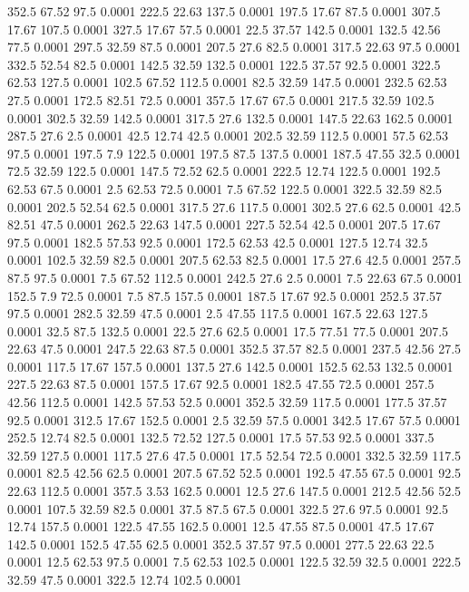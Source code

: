 352.5	67.52	97.5	0.0001
222.5	22.63	137.5	0.0001
197.5	17.67	87.5	0.0001
307.5	17.67	107.5	0.0001
327.5	17.67	57.5	0.0001
22.5	37.57	142.5	0.0001
132.5	42.56	77.5	0.0001
297.5	32.59	87.5	0.0001
207.5	27.6	82.5	0.0001
317.5	22.63	97.5	0.0001
332.5	52.54	82.5	0.0001
142.5	32.59	132.5	0.0001
122.5	37.57	92.5	0.0001
322.5	62.53	127.5	0.0001
102.5	67.52	112.5	0.0001
82.5	32.59	147.5	0.0001
232.5	62.53	27.5	0.0001
172.5	82.51	72.5	0.0001
357.5	17.67	67.5	0.0001
217.5	32.59	102.5	0.0001
302.5	32.59	142.5	0.0001
317.5	27.6	132.5	0.0001
147.5	22.63	162.5	0.0001
287.5	27.6	2.5	0.0001
42.5	12.74	42.5	0.0001
202.5	32.59	112.5	0.0001
57.5	62.53	97.5	0.0001
197.5	7.9	122.5	0.0001
197.5	87.5	137.5	0.0001
187.5	47.55	32.5	0.0001
72.5	32.59	122.5	0.0001
147.5	72.52	62.5	0.0001
222.5	12.74	122.5	0.0001
192.5	62.53	67.5	0.0001
2.5	62.53	72.5	0.0001
7.5	67.52	122.5	0.0001
322.5	32.59	82.5	0.0001
202.5	52.54	62.5	0.0001
317.5	27.6	117.5	0.0001
302.5	27.6	62.5	0.0001
42.5	82.51	47.5	0.0001
262.5	22.63	147.5	0.0001
227.5	52.54	42.5	0.0001
207.5	17.67	97.5	0.0001
182.5	57.53	92.5	0.0001
172.5	62.53	42.5	0.0001
127.5	12.74	32.5	0.0001
102.5	32.59	82.5	0.0001
207.5	62.53	82.5	0.0001
17.5	27.6	42.5	0.0001
257.5	87.5	97.5	0.0001
7.5	67.52	112.5	0.0001
242.5	27.6	2.5	0.0001
7.5	22.63	67.5	0.0001
152.5	7.9	72.5	0.0001
7.5	87.5	157.5	0.0001
187.5	17.67	92.5	0.0001
252.5	37.57	97.5	0.0001
282.5	32.59	47.5	0.0001
2.5	47.55	117.5	0.0001
167.5	22.63	127.5	0.0001
32.5	87.5	132.5	0.0001
22.5	27.6	62.5	0.0001
17.5	77.51	77.5	0.0001
207.5	22.63	47.5	0.0001
247.5	22.63	87.5	0.0001
352.5	37.57	82.5	0.0001
237.5	42.56	27.5	0.0001
117.5	17.67	157.5	0.0001
137.5	27.6	142.5	0.0001
152.5	62.53	132.5	0.0001
227.5	22.63	87.5	0.0001
157.5	17.67	92.5	0.0001
182.5	47.55	72.5	0.0001
257.5	42.56	112.5	0.0001
142.5	57.53	52.5	0.0001
352.5	32.59	117.5	0.0001
177.5	37.57	92.5	0.0001
312.5	17.67	152.5	0.0001
2.5	32.59	57.5	0.0001
342.5	17.67	57.5	0.0001
252.5	12.74	82.5	0.0001
132.5	72.52	127.5	0.0001
17.5	57.53	92.5	0.0001
337.5	32.59	127.5	0.0001
117.5	27.6	47.5	0.0001
17.5	52.54	72.5	0.0001
332.5	32.59	117.5	0.0001
82.5	42.56	62.5	0.0001
207.5	67.52	52.5	0.0001
192.5	47.55	67.5	0.0001
92.5	22.63	112.5	0.0001
357.5	3.53	162.5	0.0001
12.5	27.6	147.5	0.0001
212.5	42.56	52.5	0.0001
107.5	32.59	82.5	0.0001
37.5	87.5	67.5	0.0001
322.5	27.6	97.5	0.0001
92.5	12.74	157.5	0.0001
122.5	47.55	162.5	0.0001
12.5	47.55	87.5	0.0001
47.5	17.67	142.5	0.0001
152.5	47.55	62.5	0.0001
352.5	37.57	97.5	0.0001
277.5	22.63	22.5	0.0001
12.5	62.53	97.5	0.0001
7.5	62.53	102.5	0.0001
122.5	32.59	32.5	0.0001
222.5	32.59	47.5	0.0001
322.5	12.74	102.5	0.0001
